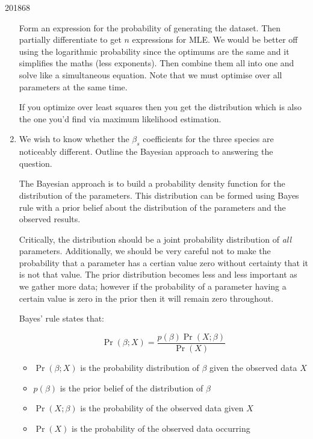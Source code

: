\documentclass[10pt,\jkfside,a4paper]{article}
\begin{document}
\begin{examquestion}{2018}{6}{8}
\begin{enumerate}[label=(\alph*)]
Form an expression for the probability of generating the dataset. Then
partially differentiate to get $n$ expressions for MLE. We would be
better off using the logarithmic probability since the optimums are the
same and it simplifies the maths (less exponents). Then combine them all
into one and solve like a simultaneous equation. Note that we must optimise
over all parameters at the same time.

If you optimize over least squares then you get the distribution which
is also the one you'd find via maximum likelihood estimation.

\fi

\item We wish to know whether the $\beta_s$ coefficients for the three
species are noticeably different. Outline the Bayesian approach to answering
the question.


\iffalse

The Bayesian approach is to build a probability density function for the
distribution of the parameters. This distribution can be formed using Bayes
rule with a prior belief about the distribution of the parameters and the
observed results.

Critically, the distribution should be a joint probability distribution of
\textit{all} parameters. Additionally, we should be very careful not to make
the probability that a parameter has a certian value zero without
certainty that it is not that value. The prior distribution becomes less and
less important as we gather more data; however if the probability of a
parameter having a certain value is zero in the prior then it will remain
zero throughout.

Bayes' rule states that:

\[
\Pr(\beta; X) = \frac{p(\beta)\Pr(X; \beta)}{\Pr(X)}
\]

\begin{itemize}

\item $\Pr(\beta; X)$ is the probability distribution of $\beta$ given the
observed data $X$

\item $p(\beta)$ is the prior belief of the distribution of $\beta$

\item $\Pr(X; \beta)$ is the probability of the observed data given $X$

\item $\Pr(X)$ is the probability of the observed data occurring


\end{itemize}
\end{enumerate}
\end{examquestion}
\end{document}
